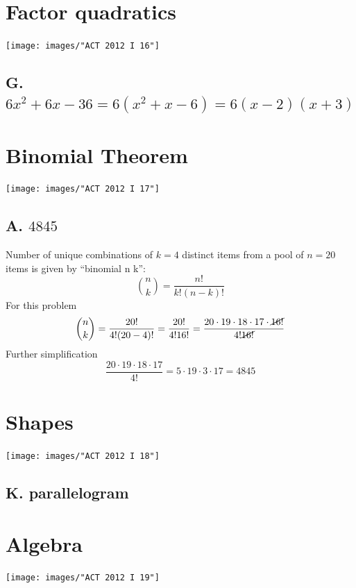 \documentclass[11pt, oneside]{article}
\begin{document}
\section{Factor quadratics}
\texttt{[image: images/"ACT 2012 I 16"]}
\subsection{G. $6x^{2} + 6x -36 = 6(x^{2}+x-6) = 6(x-2)(x+3)$}

\section{Binomial Theorem}
\texttt{[image: images/"ACT 2012 I 17"]}
\subsection{A. $4845$}

Number of unique combinations of $k=4$ distinct items from a pool of $n=20$ items is given by ``binomial n k'':
%
\begin{equation}
	\binom{n}{k} = \frac{n!} {k!(n-k)!}
\end{equation}
%
For this problem
%
\begin{equation}
	\binom{n}{k} = \frac{20!} {4!(20-4)!} = \frac{20!} {4!16!} = \frac{20\cdot19\cdot18\cdot17\cdot\cancel{16!}} {4!\cancel{16!}}
\end{equation}
%
Further simplification
%
\begin{equation}
	\frac{20\cdot19\cdot18\cdot17} {4!} = 5\cdot 19 \cdot 3 \cdot 17 = 4845
\end{equation}
%

\section{Shapes}
\texttt{[image: images/"ACT 2012 I 18"]}
\subsection{K. parallelogram}

\section{Algebra}
\texttt{[image: images/"ACT 2012 I 19"]}
\end{document}
